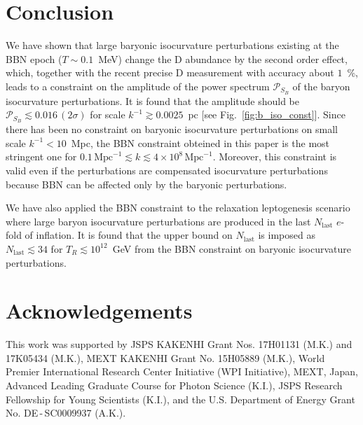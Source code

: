 \documentclass[11pt,a4paper]{article}
\begin{document}
\section{Conclusion}
\label{sec:conclusion}

We have shown that large baryonic isocurvature perturbations existing at the BBN epoch ($T\sim 0.1$~MeV) change the D abundance by the second order effect, which, together with the recent precise D measurement with accuracy about $1$~\%, leads to a constraint on the amplitude of the power spectrum $\mathcal{P}_{S_B}$ of the baryon isocurvature perturbations. 
It is found that the amplitude should be $\mathcal{P}_{S_B} \lesssim 0.016 \,(2\sigma)$ for scale $k^{-1} \gtrsim 0.0025$~pc [see Fig.~\ref{fig:b_iso_const}].  
Since there has been no constraint on baryonic isocurvature perturbations on small scale $k^{-1} < 10$~Mpc, 
the BBN constraint obteined in this paper is the most stringent one for $0.1\,\text{Mpc}^{-1} \lesssim k \lesssim 4\times 10^8\, \text{Mpc}^{-1}$. 
Moreover, this constraint is valid even if the perturbations are compensated isocurvature perturbations because BBN can be affected only by the baryonic perturbations.

We have also applied the BBN constraint to the relaxation leptogenesis scenario where large baryon isocurvature perturbations are produced in the last $N_\text{last}$ $e$-fold of inflation.
It is found that the upper bound on $N_\text{last}$ is imposed as $N_\text{last} \lesssim 34$ for $T_R \lesssim 10^{12}$~GeV from the BBN constraint on baryonic isocurvature perturbations. 




\section*{Acknowledgements}
This work was supported by JSPS KAKENHI Grant Nos. 17H01131 (M.K.) and 17K05434 (M.K.), MEXT KAKENHI Grant No. 15H05889 (M.K.), World Premier International Research Center Initiative (WPI Initiative), MEXT, Japan, Advanced Leading Graduate Course for Photon Science (K.I.), JSPS Research Fellowship for Young Scientists (K.I.), and the U.S. Department of Energy Grant No. DE\,-\,SC0009937 (A.K.).



%
\end{document}
